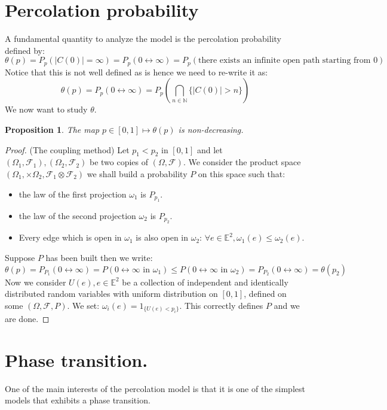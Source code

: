 \documentclass[10pt,a4paper]{book}
\newtheorem{proposition}{Proposition}[section]
\theoremstyle{definition}
\begin{document}
\section{Percolation probability}
A fundamental quantity to analyze the model is the percolation probability defined by:
\[
\theta(p) = P_p(|C(0)| = \infty) = P_p( 0 \leftrightarrow \infty) = P_p(\mbox{there exists an infinite open path starting from 0})
\] 
Notice that this is not well defined as is hence we need to re-write it as:
\[
\theta(p) = P_p(0 \leftrightarrow \infty) = P_p\left(\bigcap_{n \in \mathbb{N}} \{ |C(0)| > n\}\right) 
\]
We now want to study $\theta$. 

\begin{proposition}
The map $p \in [0,1] \mapsto \theta(p)$ is non-decreasing. 
\end{proposition}

\begin{proof} (The coupling method) Let $p_1 < p_2$ in $[0, 1]$ and let $(\Omega_1, \mathcal{F}_1), (\Omega_2, \mathcal{F}_2)$ be two copies of $(\Omega, \mathcal{F})$. We consider the product space $(\Omega_1, \times \Omega_2, \mathcal{F}_1 \otimes \mathcal{F}_2)$ we shall build a probability $P$ on this space such that: 
\begin{itemize}
\item the law of the first projection $\omega_1$ is $P_{p_1}$.
\item the law of the second projection $\omega_2$ is $P_{p_2}$. 
\item Every edge which is open in $\omega_1$ is also open in $\omega_2$: $\forall e \in \mathbb{E}^2, \omega_1(e) \leq \omega_2(e)$. 
\end{itemize}
Suppose $P$ has been built then we write:
\[
\theta(p) = P_{P_1}(0 \leftrightarrow \infty) = P(0 \leftrightarrow \infty \mbox{~in~} \omega_1) \leq P(0 \leftrightarrow \infty \mbox{~in~} \omega_2) = P_{P_2}(0 \leftrightarrow \infty) = \theta(p_2)
\]
Now we consider $U(e), e \in \mathbb{E}^2$ be a collection of independent and identically distributed random variables with uniform distribution on $[0, 1]$, defined on some $(\Omega, \mathcal{F}, P)$. We set: $\omega_i(e) = 1_{\{U(e) < p_i\}}$. This correctly defines $P$ and we are done.

\end{proof}

\section{Phase transition.}
One of the main interests of the percolation model is that it is one of the simplest models that exhibits a phase transition.
\end{document}
